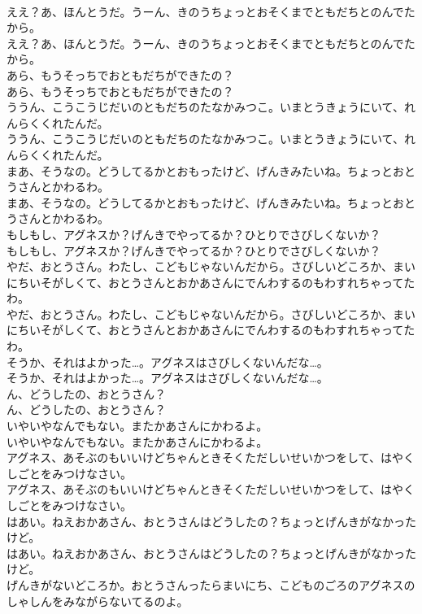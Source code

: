 \documentclass[8pt]{extreport}
\begin{document}
\begin{CJK}{UTF8}{min}
\\	ええ？あ、ほんとうだ。うーん、きのうちょっとおそくまでともだちとのんでたから。
\\	ええ？あ、ほんとうだ。うーん、きのうちょっとおそくまでともだちとのんでたから。
\\	あら、もうそっちでおともだちができたの？
\\	あら、もうそっちでおともだちができたの？
\\	ううん、こうこうじだいのともだちのたなかみつこ。いまとうきょうにいて、れんらくくれたんだ。
\\	ううん、こうこうじだいのともだちのたなかみつこ。いまとうきょうにいて、れんらくくれたんだ。
\\	まあ、そうなの。どうしてるかとおもったけど、げんきみたいね。ちょっとおとうさんとかわるわ。
\\	まあ、そうなの。どうしてるかとおもったけど、げんきみたいね。ちょっとおとうさんとかわるわ。
\\	もしもし、アグネスか？げんきでやってるか？ひとりでさびしくないか？
\\	もしもし、アグネスか？げんきでやってるか？ひとりでさびしくないか？
\\	やだ、おとうさん。わたし、こどもじゃないんだから。さびしいどころか、まいにちいそがしくて、おとうさんとおかあさんにでんわするのもわすれちゃってたわ。
\\	やだ、おとうさん。わたし、こどもじゃないんだから。さびしいどころか、まいにちいそがしくて、おとうさんとおかあさんにでんわするのもわすれちゃってたわ。
\\	そうか、それはよかった…。アグネスはさびしくないんだな…。
\\	そうか、それはよかった…。アグネスはさびしくないんだな…。
\\	ん、どうしたの、おとうさん？
\\	ん、どうしたの、おとうさん？
\\	いやいやなんでもない。またかあさんにかわるよ。
\\	いやいやなんでもない。またかあさんにかわるよ。
\\	アグネス、あそぶのもいいけどちゃんときそくただしいせいかつをして、はやくしごとをみつけなさい。
\\	アグネス、あそぶのもいいけどちゃんときそくただしいせいかつをして、はやくしごとをみつけなさい。
\\	はあい。ねえおかあさん、おとうさんはどうしたの？ちょっとげんきがなかったけど。
\\	はあい。ねえおかあさん、おとうさんはどうしたの？ちょっとげんきがなかったけど。
\\	げんきがないどころか。おとうさんったらまいにち、こどものごろのアグネスのしゃしんをみながらないてるのよ。

\end{CJK}
\end{document}
